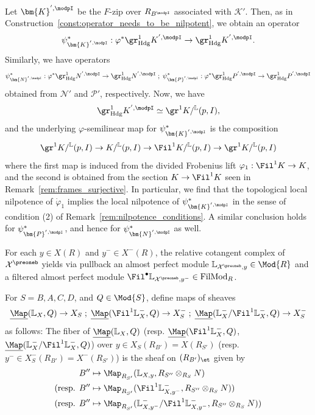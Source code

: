 \documentclass[10pt]{amsart}
\begin{document}
\begin{remark}
\label{rem:K_P_N_nilpotence}
Let $\bm{K}^{',\modpI}$ be the $F$-zip over $R_{B^\modpI}$ associated with $\mathcal{K}'$. Then, as in Construction~\ref{const:operator_needs_to_be_nilpotent}, we obtain an operator
\[
\psi^*_{\bm{K}^{',\modpI}}:\varphi^*\gr^1_{\mathrm{Hdg}}K^{',\modpI} \to \gr^1_{\mathrm{Hdg}}K^{',\modpI}.
\]
Similarly, we have operators
\[
\psi^*_{\bm{N}^{',\modpI}}:\varphi^*\gr^1_{\mathrm{Hdg}}N^{',\modpI} \to \gr^1_{\mathrm{Hdg}}N^{',\modpI}\;;\; \psi^*_{\bm{P}^{',\modpI}}:\varphi^*\gr^1_{\mathrm{Hdg}}P^{',\modpI} \to \gr^1_{\mathrm{Hdg}}P^{',\modpI}
\]
obtained from $\mathcal{N}'$ and $\mathcal{P}'$, respectively. Now, we have 
\[
\gr^1_{\mathrm{Hdg}}K^{',\modpI}\simeq \gr^1K/{}^{\mathbb{L}}(p,I),
\]
and the underlying $\varphi$-semilinear map for $\psi^*_{\bm{K}^{',\modpI}}$ is the composition
\[
\gr^1K/{}^{\mathbb{L}}(p,I) \to K/{}^{\mathbb{L}}(p,I)\to \Fil^1K/{}^{\mathbb{L}}(p,I)\to \gr^1K/{}^{\mathbb{L}}(p,I)
\]
where the first map is induced from the divided Frobenius lift $\varphi_1:\Fil^1K\to K$, and the second is obtained from the section $K\to \Fil^1K$ seen in Remark~\ref{rem:frames_surjective}. In particular, we find that the topological local nilpotence of $\dot\varphi_1$ implies the local nilpotence of $\psi^*_{\bm{K}^{',\modpI}}$ in the sense of condition (2) of Remark~\ref{rem:nilpotence_conditions}. A similar conclusion holds for $\psi^*_{\bm{P}^{',\modpI}}$, and hence for $\psi^*_{\bm{N}^{',\modpI}}$ as well.
\end{remark}


\begin{construction}
\label{const:various_xs_cotangent}
For each $y\in X(R)$ and $y^-\in X^-(R)$, the relative cotangent complex of $\mathcal{X}^\preoneb$ yields via pullback an almost perfect module $\mathbb{L}_{\mathcal{X}^\preoneb,y}\in \Mod{R}$ and a filtered almost perfect module $\Fil^\bullet\mathbb{L}_{\mathcal{X}^\preoneb,y^-}\in \mathrm{FilMod}_R$. 

For $S = B,A,C,D$, and $Q\in \Mod{S}$, define maps of sheaves
\[
\underline{\Map}(\mathbb{L}_X,Q) \to X_S\;;\; \underline{\Map}(\Fil^1\mathbb{L}^-_X,Q) \to X^-_S\;;\; \underline{\Map}(\mathbb{L}^-_X/\Fil^1\mathbb{L}^-_X,Q) \to X^-_S
\]
as follows: The fiber of $\underline{\Map}(\mathbb{L}_X,Q)$ (resp. $\underline{\Map}(\Fil^1\mathbb{L}^-_X,Q)$, $\underline{\Map}(\mathbb{L}^-_X/\Fil^1\mathbb{L}^-_X,Q)$) over $y\in X_S(R_{B'}) = X(R_{S'})$ (resp. $y^-\in X^-_S(R_{B'}) = X^-(R_{S'})$) is the sheaf on $(R_{B'})_{\et}$ given by
\begin{align*}
B''&\mapsto \Map_{R_{S'}}(\mathbb{L}_{X,y},R_{S''}\otimes_{R_{S}}N)\\
\text{(resp. }B''&\mapsto \Map_{R_{S'}}(\Fil^1\mathbb{L}^-_{X,y^-},R_{S''}\otimes_{R_{S}}N))\\
\text{(resp. }B''&\mapsto \Map_{R_{S'}}(\mathbb{L}^-_{X,y^-}/\Fil^1\mathbb{L}^-_{X,y^-},R_{S''}\otimes_{R_{S}}N))
\end{align*}
\end{construction}
\end{document}
